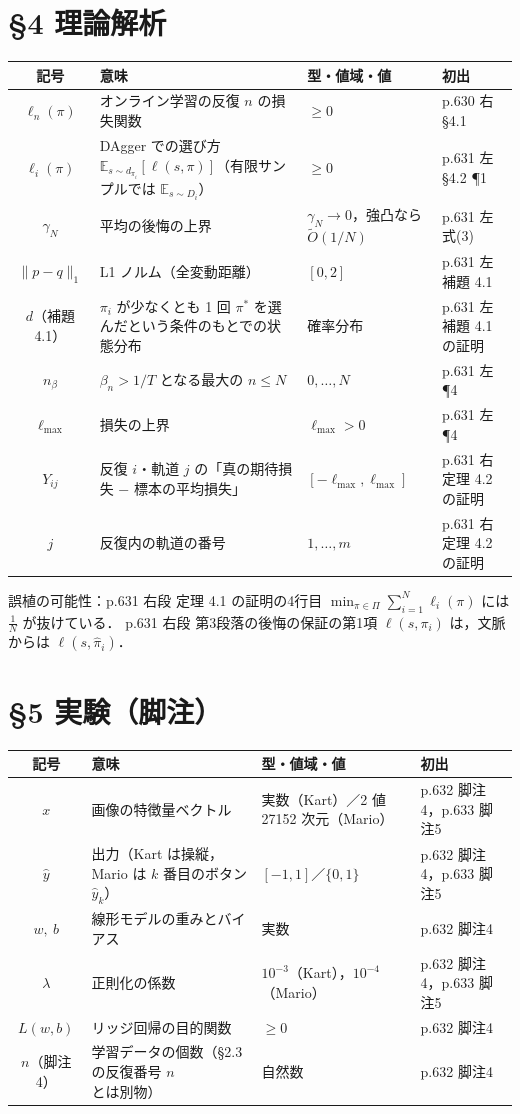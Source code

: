 \documentclass[a4paper,10pt]{ltjsarticle}
\newcommand{\note}[1]{\textcolor{red!70!black}{#1}}
\newcommand{\E}{\mathbb{E}}
\newenvironment{symtab}{%
  \par\noindent\begin{tabular}{SMTP}
  \toprule
  記号 & 意味 & 型・値域・値 & 初出 \\
  \midrule
}{\bottomrule\end{tabular}\par\medskip}
\begin{document}
\section{§4 理論解析}
\begin{symtab}
$\ell_n(\pi)$ & オンライン学習の反復 $n$ の損失関数 & $\ge 0$ & p.630 右 §4.1 \\
$\ell_i(\pi)$ & DAgger での選び方 $\E_{s\sim d_{\pi_i}}[\ell(s,\pi)]$（有限サンプルでは $\E_{s\sim D_i}$） & $\ge 0$ & p.631 左 §4.2 ¶1 \\
$\gamma_N$ & 平均の後悔の上界 & $\gamma_N\to 0$，強凸なら $\tilde O(1/N)$ & p.631 左 式(3) \\
$\|p-q\|_1$ & L1 ノルム（全変動距離） & $[0,2]$ & p.631 左 補題 4.1 \\
$d$（補題 4.1） & $\pi_i$ が少なくとも 1 回 $\pi^*$ を選んだという条件のもとでの状態分布 & 確率分布 & p.631 左 補題 4.1 の証明 \\
$n_\beta$ & $\beta_n>1/T$ となる最大の $n\le N$ & $0,\dots,N$ & p.631 左 ¶4 \\
$\ell_{\max}$ & 損失の上界 & $\ell_{\max}>0$ & p.631 左 ¶4 \\
$Y_{ij}$ & 反復 $i$・軌道 $j$ の「真の期待損失 $-$ 標本の平均損失」 & $[-\ell_{\max},\ell_{\max}]$ & p.631 右 定理 4.2 の証明 \\
$j$ & 反復内の軌道の番号 & $1,\dots,m$ & p.631 右 定理 4.2 の証明 \\
\end{symtab}

\noindent\note{誤植の可能性}：p.631 右段 定理 4.1 の証明の4行目 $\min_{\pi\in\Pi}\sum_{i=1}^N\ell_i(\pi)$ には $\frac1N$ が抜けている．
p.631 右段 第3段落の後悔の保証の第1項 $\ell(s,\pi_i)$ は，文脈からは $\ell(s,\hat\pi_i)$．

\section{§5 実験（脚注）}
\begin{symtab}
$x$ & 画像の特徴量ベクトル & 実数（Kart）／2 値 27152 次元（Mario） & p.632 脚注4，p.633 脚注5 \\
$\hat y$ & 出力（Kart は操縦，Mario は $k$ 番目のボタン $\hat y_k$） & $[-1,1]$／$\{0,1\}$ & p.632 脚注4，p.633 脚注5 \\
$w,\ b$ & 線形モデルの重みとバイアス & 実数 & p.632 脚注4 \\
$\lambda$ & 正則化の係数 & $10^{-3}$（Kart），$10^{-4}$（Mario） & p.632 脚注4，p.633 脚注5 \\
$L(w,b)$ & リッジ回帰の目的関数 & $\ge 0$ & p.632 脚注4 \\
$n$（脚注4） & 学習データの個数\note{（§2.3 の反復番号 $n$ とは別物）} & 自然数 & p.632 脚注4 \\
\end{symtab}
\end{document}
